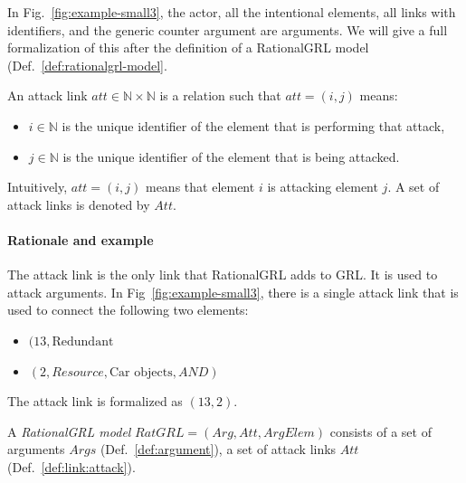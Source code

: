 In Fig.~\ref{fig:example-small3}, the actor, all the intentional elements, all links with identifiers, and the generic counter argument are arguments. We will give a full formalization of this after the definition of a RationalGRL model (Def.~\ref{def:rationalgrl-model}.

\begin{definition}
\label{def:link:attack}
An attack link $att\in \mathbb{N}\times \mathbb{N}$ is a relation such that $att=(i,j)$ means:
\begin{itemize}
\item $i\in \mathbb{N}$ is the unique identifier of the element that is performing that attack,
\item $j\in \mathbb{N}$ is the unique identifier of the element that is being attacked.
\end{itemize}
Intuitively, $att=(i,j)$ means that element $i$ is attacking element $j$. A set of attack links is denoted by $Att$.
\end{definition}

\paragraph{Rationale and example} The attack link is the only link that RationalGRL adds to GRL. It is used to attack arguments. In Fig~\ref{fig:example-small3}, there is a single attack link that is used to connect the following two elements:
\begin{itemize}
\item $(13, \text{Redundant}$
\item $(2, Resource, \text{Car objects}, AND)$
\end{itemize}

The attack link is formalized as $(13, 2)$.

\begin{definition}
\label{def:rationalgrl-model}
A \emph{RationalGRL model} $RatGRL=(Arg, Att, ArgElem)$ consists of a set of arguments $Args$ (Def.~\ref{def:argument}), a set of attack links $Att$ (Def.~\ref{def:link:attack}).
\end{definition}


